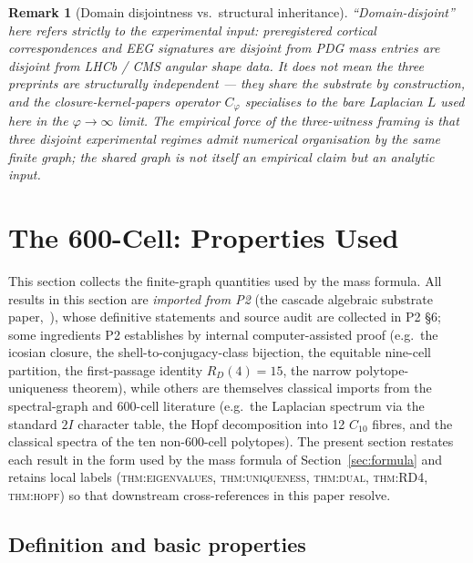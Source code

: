 \documentclass[12pt]{article}
\newtheorem{remark}[theorem]{Remark}
\begin{document}
\begin{remark}[Domain disjointness vs.\ structural inheritance]
``Domain-disjoint'' here refers strictly to the experimental input: preregistered cortical correspondences and EEG signatures are disjoint from PDG mass entries are disjoint from LHCb / CMS angular shape data. It does not mean the three preprints are structurally independent --- they share the substrate by construction, and the closure-kernel-papers operator $C_\varphi$ specialises to the bare Laplacian $L$ used here in the $\varphi \to \infty$ limit. The empirical force of the three-witness framing is that three disjoint experimental regimes admit numerical organisation by the same finite graph; the shared graph is not itself an empirical claim but an analytic input.
\end{remark}

\section{The 600-Cell: Properties Used}\label{sec:600cell}

This section collects the finite-graph quantities used by the mass formula. All results in this section are \emph{imported from P2} (the cascade algebraic substrate paper,~\citep{CascadeAlgSubstrate}), whose definitive statements and source audit are collected in P2 \S 6; some ingredients P2 establishes by internal computer-assisted proof (e.g.\ the icosian closure, the shell-to-conjugacy-class bijection, the equitable nine-cell partition, the first-passage identity $R_D(4) = 15$, the narrow polytope-uniqueness theorem), while others are themselves classical imports from the spectral-graph and $600$-cell literature (e.g.\ the Laplacian spectrum via the standard $2I$ character table, the Hopf decomposition into 12 $C_{10}$ fibres, and the classical spectra of the ten non-$600$-cell polytopes). The present section restates each result in the form used by the mass formula of Section~\ref{sec:formula} and retains local labels (\textsc{thm:eigenvalues}, \textsc{thm:uniqueness}, \textsc{thm:dual}, \textsc{thm:RD4}, \textsc{thm:hopf}) so that downstream cross-references in this paper resolve.

\subsection{Definition and basic properties}
\end{document}
